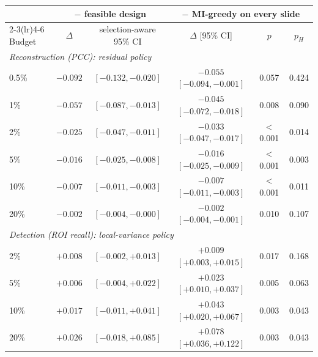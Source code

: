 \begin{tabular}{lccccc}
\toprule
 & \multicolumn{2}{c}{$-$ feasible design} & \multicolumn{3}{c}{$-$ MI-greedy on every slide} \\
\cmidrule(lr){2-3}\cmidrule(lr){4-6}
Budget & $\Delta$ & selection-aware 95\% CI & $\Delta$ [95\% CI] & $p$ & $p_H$ \\
\midrule
\multicolumn{6}{l}{\emph{Reconstruction (PCC): residual policy}} \\
0.5\% & $-0.092$ & $[-0.132, -0.020]$ & $-0.055$ $[-0.094, -0.001]$ & 0.057 & 0.424 \\
1\% & $-0.057$ & $[-0.087, -0.013]$ & $-0.045$ $[-0.072, -0.018]$ & 0.008 & 0.090 \\
2\% & $-0.025$ & $[-0.047, -0.011]$ & $-0.033$ $[-0.047, -0.017]$ & $<$0.001 & 0.014 \\
5\% & $-0.016$ & $[-0.025, -0.008]$ & $-0.016$ $[-0.025, -0.009]$ & $<$0.001 & 0.003 \\
10\% & $-0.007$ & $[-0.011, -0.003]$ & $-0.007$ $[-0.011, -0.003]$ & $<$0.001 & 0.011 \\
20\% & $-0.002$ & $[-0.004, -0.000]$ & $-0.002$ $[-0.004, -0.001]$ & 0.010 & 0.107 \\
\midrule
\multicolumn{6}{l}{\emph{Detection (ROI recall): local-variance policy}} \\
2\% & ${+}0.008$ & $[-0.002, {+}0.013]$ & ${+}0.009$ $[{+}0.003, {+}0.015]$ & 0.017 & 0.168 \\
5\% & ${+}0.006$ & $[-0.004, {+}0.022]$ & ${+}0.023$ $[{+}0.010, {+}0.037]$ & 0.005 & 0.063 \\
10\% & ${+}0.017$ & $[-0.011, {+}0.041]$ & ${+}0.043$ $[{+}0.020, {+}0.067]$ & 0.003 & 0.043 \\
20\% & ${+}0.026$ & $[-0.018, {+}0.085]$ & ${+}0.078$ $[{+}0.036, {+}0.122]$ & 0.003 & 0.043 \\
\bottomrule
\end{tabular}